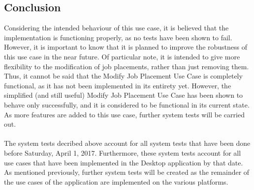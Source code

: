 \documentclass[12pt]{report}
\begin{document}
\subsection*{Conclusion}
Considering the intended behaviour of this use case, it is believed that the implementation is
functioning properly, as no tests have been shown to fail. However, it is important to know that it
is planned to improve the robustness of this use case in the near future. Of particular note, it is
intended to give more flexibility to the modification of job placements, rather than just removing
them. Thus, it cannot be said that the Modify Job Placement Use Case is completely functional, as it
has not been implemented in its entirety yet. However, the simplified (and still useful) Modify Job
Placement Use Case has been shown to behave only successfully, and it is considered to be functional
in its current state. As more features are added to this use case, further system tests will be
carried out.\\\\
The system tests decribed above account for all system tests that have been done before Saturday,
April 1, 2017. Furthermore, these system tests account for all use cases that have been implemented
in the Desktop application by that date. As mentioned previously, further system tests will be
created as the remainder of the use cases of the application are implemented on the various
platforms.
\end{document}
